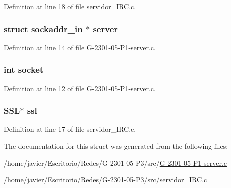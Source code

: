 Definition at line 18 of file servidor\-\_\-\-I\-R\-C.\-c.

\hypertarget{structthread_args_a174501e91471cbe22c45a3a89a932d62}{
\subsubsection[{server}]{\setlength{\rightskip}{0pt plus 5cm}struct sockaddr\-\_\-in $\ast$ server}}\label{structthread_args_a174501e91471cbe22c45a3a89a932d62}


Definition at line 14 of file G-\/2301-\/05-\/\-P1-\/server.\-c.

\hypertarget{structthread_args_a3666576f6b88007cc7b8f26c7da596c8}{
\subsubsection[{socket}]{\setlength{\rightskip}{0pt plus 5cm}int socket}}\label{structthread_args_a3666576f6b88007cc7b8f26c7da596c8}


Definition at line 12 of file G-\/2301-\/05-\/\-P1-\/server.\-c.

\hypertarget{structthread_args_ae7c0417fa2881f3546920311fee80311}{
\subsubsection[{ssl}]{\setlength{\rightskip}{0pt plus 5cm}S\-S\-L$\ast$ ssl}}\label{structthread_args_ae7c0417fa2881f3546920311fee80311}


Definition at line 17 of file servidor\-\_\-\-I\-R\-C.\-c.



The documentation for this struct was generated from the following files\-:\begin{DoxyCompactItemize}
\item 
/home/javier/\-Escritorio/\-Redes/\-G-\/2301-\/05-\/\-P3/src/\hyperlink{_g-2301-05-_p1-server_8c}{G-\/2301-\/05-\/\-P1-\/server.\-c}\item 
/home/javier/\-Escritorio/\-Redes/\-G-\/2301-\/05-\/\-P3/src/\hyperlink{servidor___i_r_c_8c}{servidor\-\_\-\-I\-R\-C.\-c}\end{DoxyCompactItemize}
